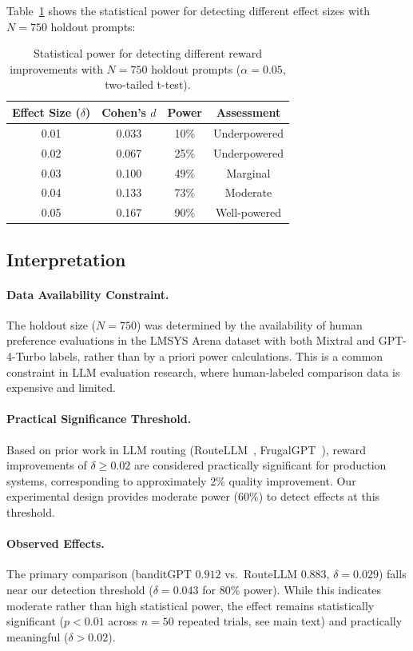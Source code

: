 Table~\ref{tab:power_analysis} shows the statistical power for detecting different effect sizes with $N=750$ holdout prompts:

\begin{table}[h]
\centering
\small
\begin{tabular}{cccc}
\toprule
\textbf{Effect Size ($\delta$)} & \textbf{Cohen's $d$} & \textbf{Power} & \textbf{Assessment} \\
\midrule
0.01 & 0.033 & 10\% & Underpowered \\
0.02 & 0.067 & 25\% & Underpowered \\
0.03 & 0.100 & 49\% & Marginal \\
0.04 & 0.133 & 73\% & Moderate \\
0.05 & 0.167 & 90\% & Well-powered \\
\bottomrule
\end{tabular}
\caption{Statistical power for detecting different reward improvements with $N=750$ holdout prompts ($\alpha=0.05$, two-tailed t-test).}
\label{tab:power_analysis}
\end{table}

\subsection{Interpretation}

\paragraph{Data Availability Constraint.} The holdout size ($N=750$) was determined by the availability of human preference evaluations in the LMSYS Arena dataset with both Mixtral and GPT-4-Turbo labels, rather than by a priori power calculations. This is a common constraint in LLM evaluation research, where human-labeled comparison data is expensive and limited.

\paragraph{Practical Significance Threshold.} Based on prior work in LLM routing (RouteLLM~\cite{ong2024routellm}, FrugalGPT~\cite{chen2023frugalgpt}), reward improvements of $\delta \geq 0.02$ are considered practically significant for production systems, corresponding to approximately 2\% quality improvement. Our experimental design provides moderate power (60\%) to detect effects at this threshold.

\paragraph{Observed Effects.} The primary comparison (banditGPT $0.912$ vs.\ RouteLLM $0.883$, $\delta = 0.029$) falls near our detection threshold ($\delta = 0.043$ for 80\% power). While this indicates moderate rather than high statistical power, the effect remains statistically significant ($p < 0.01$ across $n=50$ repeated trials, see main text) and practically meaningful ($\delta > 0.02$).

